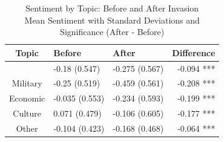\begin{table}[!t]
\caption*{
{\large Sentiment by Topic: Before and After Invasion} \\ 
{\small Mean Sentiment with Standard Deviations and Significance (After - Before)}
} 
\fontsize{12.0pt}{14.4pt}\selectfont
\begin{tabular*}{\linewidth}{@{\extracolsep{\fill}}cllr}
\toprule
Topic & Before & After & Difference \\ 
\midrule\addlinespace[2.5pt]
{Political} & {-0.18
(0.547)} & {-0.275
(0.567)} & {-0.094 ***} \\ 
{Military} & {-0.25
(0.519)} & {-0.459
(0.561)} & {-0.208 ***} \\ 
{Economic} & {-0.035
(0.553)} & {-0.234
(0.593)} & {-0.199 ***} \\ 
{Culture} & {0.071
(0.479)} & {-0.106
(0.605)} & {-0.177 ***} \\ 
{Other} & {-0.104
(0.423)} & {-0.168
(0.468)} & {-0.064 ***} \\ 
\bottomrule
\end{tabular*}
\end{table}

